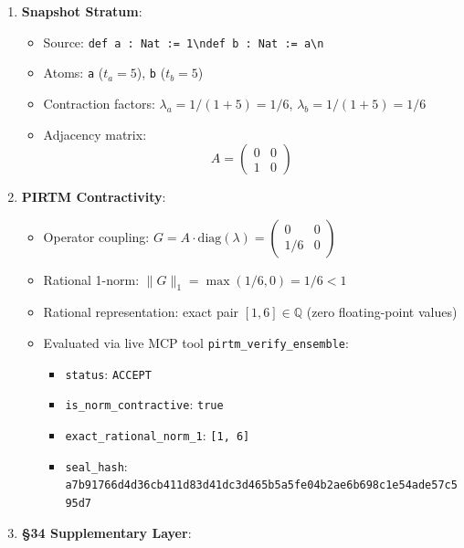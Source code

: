 \documentclass[
]{article}
\providecommand{\tightlist}{%
  \setlength{\itemsep}{0pt}\setlength{\parskip}{0pt}}
\begin{document}
\begin{enumerate}
\def\labelenumi{\arabic{enumi}.}
\tightlist
\item
  \textbf{Snapshot Stratum}:

  \begin{itemize}
  \tightlist
  \item
    Source:
    \texttt{def\ a\ :\ Nat\ :=\ 1\textbackslash{}ndef\ b\ :\ Nat\ :=\ a\textbackslash{}n}
  \item
    Atoms: \texttt{a} (\(t_a = 5\)), \texttt{b} (\(t_b = 5\))
  \item
    Contraction factors: \(\lambda_a = 1/(1+5) = 1/6\),
    \(\lambda_b = 1/(1+5) = 1/6\)
  \item
    Adjacency matrix:
    \[A = \begin{pmatrix} 0 & 0 \\ 1 & 0 \end{pmatrix}\]
  \end{itemize}
\item
  \textbf{PIRTM Contractivity}:

  \begin{itemize}
  \tightlist
  \item
    Operator coupling:
    \(G = A \cdot \mathrm{diag}(\lambda) = \begin{pmatrix} 0 & 0 \\ 1/6 & 0 \end{pmatrix}\)
  \item
    Rational 1-norm: \(\|G\|_1 = \max(1/6, 0) = 1/6 < 1\)
  \item
    Rational representation: exact pair \([1, 6] \in \mathbb{Q}\) (zero
    floating-point values)
  \item
    Evaluated via live MCP tool \texttt{pirtm\_verify\_ensemble}:

    \begin{itemize}
    \tightlist
    \item
      \texttt{status}: \texttt{ACCEPT}
    \item
      \texttt{is\_norm\_contractive}: \texttt{true}
    \item
      \texttt{exact\_rational\_norm\_1}: \texttt{{[}1,\ 6{]}}
    \item
      \texttt{seal\_hash}:
      \texttt{a7b91766d4d36cb411d83d41dc3d465b5a5fe04b2ae6b698c1e54ade57c595d7}
    \end{itemize}
  \end{itemize}
\item
  \textbf{§34 Supplementary Layer}:


\end{enumerate}
\end{document}
